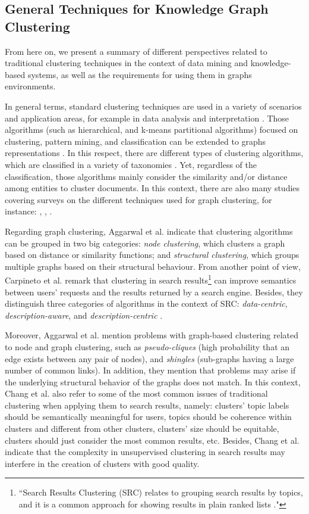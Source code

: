 \documentclass[runningheads]{llncs}
\begin{document}
\subsection{General Techniques for Knowledge Graph Clustering} \label{general-techniques}
From here on, we present a summary of different perspectives related to traditional clustering techniques in the context of data mining and knowledge-based systems, as well as the requirements for using them in graphs environments.

In general terms, standard clustering techniques are used in a variety of scenarios and application areas, for example in data analysis and interpretation \cite{Pedrycz}. Those algorithms (such as hierarchical, and k-means partitional algorithms) focused on clustering, pattern mining, and classification can be extended to graphs representations \cite{Aggarwal}. In this respect, there are different types of clustering algorithms, which are classified in a variety of taxonomies \cite{Zacharski} \cite{Pedrycz} \cite{Berkhin}. Yet, regardless of the classification, those algorithms mainly consider the similarity and/or distance among entities \cite{Pedrycz} to cluster documents. In this context, there are also many studies covering surveys on the different techniques used for graph clustering, for instance: \cite{Schaeffer}, \cite{Aggarwal}, \cite{Carpineto}. 

Regarding graph clustering, Aggarwal et al. \cite{Aggarwal} indicate that clustering algorithms can be grouped in two big categories: \textit{node clustering}, which clusters a graph based on distance or similarity functions; and \textit{structural clustering}, which groups multiple graphs based on their structural behaviour. From another point of view, Carpineto et al. \cite{Carpineto} remark that clustering in search results\footnote{``Search Results Clustering (SRC) relates to grouping search results by topics, and it is a common approach for showing results in plain ranked lists \cite{Chang}."} can improve semantics between users' requests and the results returned by a search engine. Besides, they distinguish three categories of algorithms in the context of SRC: \textit{data-centric}, \textit{description-aware}, and \textit{description-centric} \cite{Carpineto}.

Moreover, Aggarwal et al. \cite{Aggarwal} mention problems with graph-based clustering related to node and graph clustering, such as \textit{pseudo-cliques} (high probability that an edge exists between any pair of nodes), and \textit{shingles} (sub-graphs having a large number of common links). In addition, they mention that problems may arise if the underlying structural behavior of the graphs does not match. In this context, Chang et al. \cite{Chang} also refer to some of the most common issues of traditional clustering when applying them to search results, namely: clusters' topic labels should be semantically meaningful for users, topics should be coherence within clusters and different from other clusters, clusters' size should be equitable, clusters should just consider the most common results, etc. Besides, Chang et al. \cite{Chang} indicate that the complexity in unsupervised clustering in search results may interfere in the creation of clusters with good quality.
\end{document}
